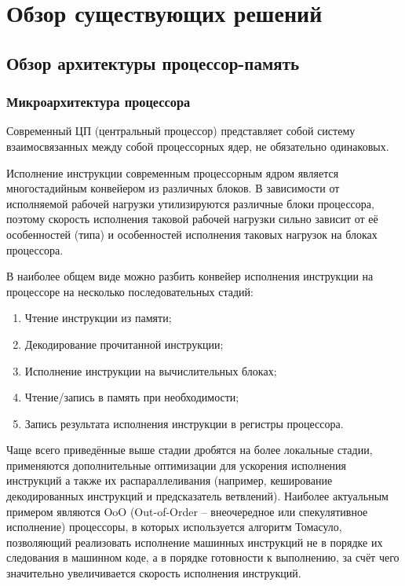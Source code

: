 \section{Обзор существующих решений}
\label{sec:Section2} 

\subsection{Обзор архитектуры процессор-память}

\subsubsection{Микроархитектура процессора}

    Современный ЦП (центральный процессор) представляет собой
    систему взаимосвязанных между собой процессорных ядер, не обязательно одинаковых.

    Исполнение инструкции современным процессорным ядром является многостадийным конвейером
    из различных блоков. В зависимости от исполняемой рабочей нагрузки утилизируются различные блоки
    процессора, поэтому скорость исполнения таковой рабочей нагрузки сильно зависит
    от её особенностей (типа) и особенностей исполнения таковых нагрузок на блоках процессора.

    В наиболее общем виде можно разбить конвейер исполнения инструкции на процессоре на несколько
    последовательных стадий:
    \begin{enumerate}
        \item Чтение инструкции из памяти;
        \item Декодирование прочитанной инструкции;
        \item Исполнение инструкции на вычислительных блоках;
        \item Чтение/запись в память при необходимости;
        \item Запись результата исполнения инструкции в регистры процессора.
    \end{enumerate}

    Чаще всего приведённые выше стадии дробятся на более локальные стадии, применяются
    дополнительные оптимизации для ускорения исполнения инструкций а также их распараллеливания
    (например, кеширование декодированных инструкций и предсказатель ветвлений). Наиболее
    актуальным примером являются OoO (Out-of-Order -- внеочередное или спекулятивное исполнение)
    процессоры, в которых используется алгоритм Томасуло, позволяющий реализовать
    исполнение машинных инструкций не в порядке их следования в машинном коде, а в порядке
    готовности к выполнению, за счёт чего значительно увеличивается скорость исполнения инструкций.

